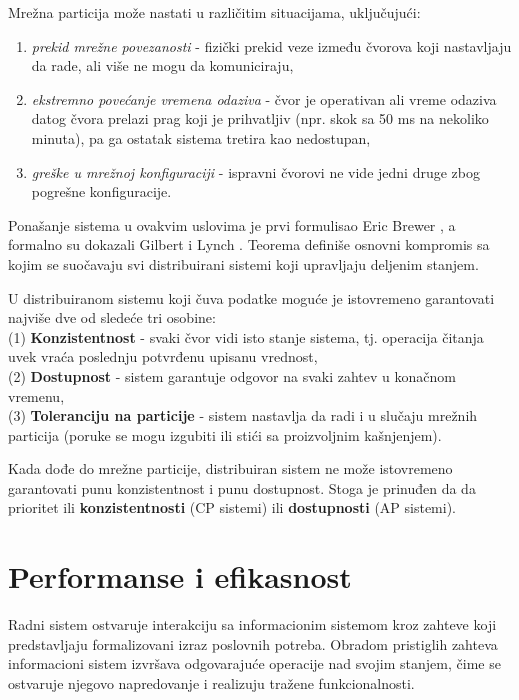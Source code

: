 Mrežna particija može nastati u različitim situacijama, uključujući:
\begin{enumerate}
\item \textit{prekid mrežne povezanosti} - fizički prekid veze između čvorova koji nastavljaju da rade, ali više ne mogu da komuniciraju,
\item \textit{ekstremno povećanje vremena odaziva} - čvor je operativan ali vreme odaziva datog čvora prelazi prag koji je prihvatljiv (npr. skok sa 50 ms na nekoliko minuta), pa ga ostatak sistema tretira kao nedostupan,
\item \textit{greške u mrežnoj konfiguraciji} - ispravni čvorovi ne vide jedni druge zbog pogrešne konfiguracije.
\end{enumerate}

Ponašanje sistema u ovakvim uslovima je prvi formulisao Eric Brewer \cite{brewer2000towards}, a formalno su dokazali Gilbert i Lynch \cite{gilbert2002brewer}. Teorema definiše osnovni kompromis sa kojim se suočavaju svi distribuirani sistemi koji upravljaju deljenim stanjem.

\begin{teorema}\label{teorema:cap}
U distribuiranom sistemu koji čuva podatke moguće je istovremeno garantovati najviše dve od sledeće tri osobine:\\
(1) \textbf{Konzistentnost } - svaki čvor vidi isto stanje sistema, tj. operacija čitanja uvek vraća poslednju potvrđenu upisanu vrednost,\\
(2) \textbf{Dostupnost } - sistem garantuje odgovor na svaki zahtev u konačnom vremenu,\\
(3) \textbf{Toleranciju na particije } - sistem nastavlja da radi i u slučaju mrežnih particija (poruke se mogu izgubiti ili stići sa proizvoljnim kašnjenjem).
\end{teorema}

\begin{posledica}
Kada dođe do mrežne particije, distribuiran sistem ne može istovremeno garantovati punu konzistentnost i punu dostupnost. Stoga je prinuđen da da prioritet ili \textbf{konzistentnosti} (CP sistemi) ili \textbf{dostupnosti} (AP sistemi).
\end{posledica}

\section{Performanse i efikasnost}
Radni sistem ostvaruje interakciju sa informacionim sistemom kroz zahteve koji predstavljaju formalizovani izraz poslovnih potreba. Obradom pristiglih zahteva informacioni sistem izvršava odgovarajuće operacije nad svojim stanjem, čime se ostvaruje njegovo napredovanje i realizuju tražene funkcionalnosti.

